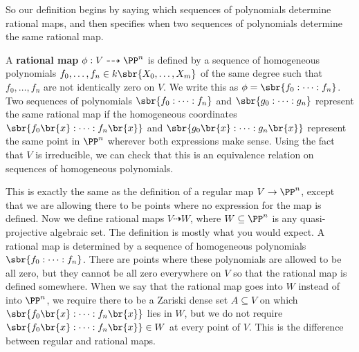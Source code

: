 So our definition begins by saying which sequences of polynomials determine rational maps, and then specifies when two sequences of polynomials determine the same rational map.

\begin{definition*}
A \textbf{rational map} $ \phi : V \dashrightarrow \PP^n $ is defined by a sequence of homogeneous polynomials $ f_0, \dots, f_n \in k\sbr{X_0, \dots, X_m} $ of the same degree such that $ f_0, \dots, f_n $ are not identically zero on $ V $. We write this as $ \phi = \sbr{f_0 : \dots : f_n} $. Two sequences of polynomials $ \sbr{f_0 : \dots : f_n} $ and $ \sbr{g_0 : \dots : g_n} $ represent the same rational map if the homogeneous coordinates $ \sbr{f_0\br{x} : \dots : f_n\br{x}} $ and $ \sbr{g_0\br{x} : \dots : g_n\br{x}} $ represent the same point in $ \PP^n $ wherever both expressions make sense. Using the fact that $ V $ is irreducible, we can check that this is an equivalence relation on sequences of homogeneous polynomials.
\end{definition*}

This is exactly the same as the definition of a regular map $ V \to \PP^n $, except that we are allowing there to be points where no expression for the map is defined. Now we define rational maps $ V \dashrightarrow W $, where $ W \subseteq \PP^n $ is any quasi-projective algebraic set. The definition is mostly what you would expect. A rational map is determined by a sequence of homogeneous polynomials $ \sbr{f_0 : \dots : f_n} $. There are points where these polynomials are allowed to be all zero, but they cannot be all zero everywhere on $ V $ so that the rational map is defined somewhere. When we say that the rational map goes into $ W $ instead of into $ \PP^n $, we require there to be a Zariski dense set $ A \subseteq V $ on which $ \sbr{f_0\br{x} : \dots : f_n\br{x}} $ lies in $ W $, but we do not require $ \sbr{f_0\br{x} : \dots : f_n\br{x}} \in W $ at every point of $ V $. This is the difference between regular and rational maps.

